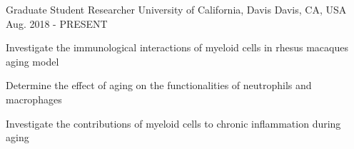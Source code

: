 

\begin{cventries}

  \cventry
    {Graduate Student Researcher} %
    {University of California, Davis} %
    {Davis, CA, USA} %
    {Aug. 2018 - PRESENT} %
    {
      \begin{cvitems} %
        \item {Investigate the immunological interactions of myeloid cells in rhesus macaques aging model}
        \item {Determine the effect of aging on the functionalities of neutrophils and macrophages }
        \item {Investigate the contributions of myeloid cells to chronic inflammation during aging}
      \end{cvitems}
    }


\end{cventries}
